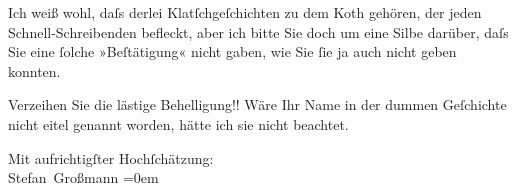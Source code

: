 \pstart
           Ich weiß wohl, daſs derlei Klatſchgeſchichten zu dem Koth gehören, der jeden
               Schnell-Schreibenden befleckt, aber ich bitte Sie doch um eine Silbe darüber, daſs
               Sie eine ſolche »Beſtätigung« nicht gaben, wie Sie ſie ja auch nicht geben
               konnten.\pend
           
\pstart
           Verzeihen Sie die lästige Behelligung!! Wäre Ihr Name in der dummen Geſchichte nicht
               eitel genannt worden, hätte ich sie nicht beachtet.\pend
           
\pstart
           Mit aufrichtigſter Hochſchätzung:{\\[\baselineskip]}\spacefill\mbox{Stefan Großmann}\pend
           \leftskip=0em{}\endnumbering{}  
      